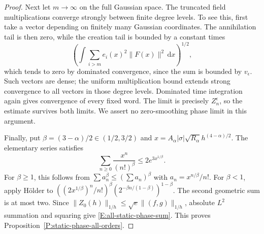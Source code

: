\documentclass[12pt]{article}
\numberwithin{equation}{section}
\theoremstyle{definition}
\newcommand{\ud}{\,\mathrm{d}}
\begin{document}
\begin{proof}
  Next let $m\to\infty$ on the full Gaussian space.
  The truncated field multiplications converge strongly between
  finite degree levels. To see this, first take a vector depending on
  finitely many Gaussian coordinates. The annihilation tail is then
  zero, while the creation tail is bounded by a constant times
  \[
    \left(\int\sum_{i>m}e_i(x)^2\|F(x)\|^2\ud x\right)^{1/2},
  \]
  which tends to zero by dominated convergence, since the sum is
  bounded by $v_\epsilon$. Such vectors are dense; the uniform
  multiplication bound extends strong convergence to all vectors
  in those degree levels. Dominated time integration again gives
  convergence of every fixed word. The limit is precisely
  $Z_n^\epsilon$, so the estimate survives both limits.
  We assert no zero-smoothing phase limit in this argument.

  Finally, put $\beta=(3-\alpha)/2\in(1/2,3/2)$ and
  $x=A_\alpha|\sigma|\sqrt{R_\alpha}h^{(4-\alpha)/2}$.
  The elementary series satisfies
  \[
    \sum_{n\ge0}\frac{x^n}{(n!)^\beta}
    \le2e^{3x^{1/\beta}}.
  \]
  For $\beta\ge1$, this follows from
  $\sum a_n^\beta\le(\sum a_n)^\beta$ with
  $a_n=x^{n/\beta}/n!$.
  For $\beta<1$, apply H\"older to
  $((2x^{1/\beta})^n/n!)^\beta
  (2^{-\beta n/(1-\beta)})^{1-\beta}$.
  The second geometric sum is at most two.
  Since $\|Z_0(h)\|_{1/h}\le\sqrt e\|(f,g)\|_{1/h}$,
  absolute $L^2$ summation and squaring give
  \eqref{E:all-static-phase-sum}.
  This proves Proposition~\ref{P:static-phase-all-orders}.
\end{proof}
\end{document}
